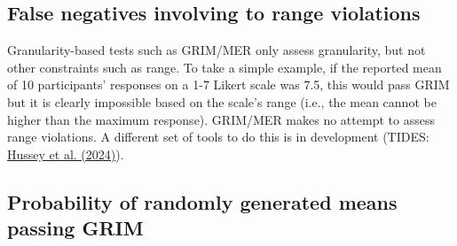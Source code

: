 \documentclass[letterpaper, 12pt]{article}
\begin{document}
{\subsection*{False negatives involving to range violations}

Granularity-based tests such as GRIM/MER only assess granularity, but not other constraints such as range. To take a simple example, if the reported mean of 10 participants' responses on a 1-7 Likert scale was 7.5, this would pass GRIM but it is clearly impossible based on the scale's range (i.e., the mean cannot be higher than the maximum response). GRIM/MER makes no attempt to assess range violations. A different set of tools to do this is in development (TIDES: \href{https://github.com/ianhussey/tides}{Hussey et al. (2024)}). 


\subsection*{Probability of randomly generated means passing GRIM}

}
\end{document}
